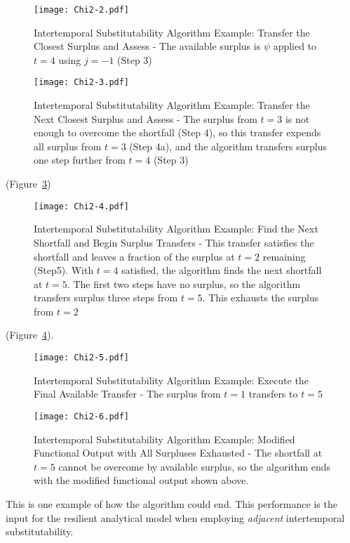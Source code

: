 \documentclass[preprint,12pt]{elsarticle}
\begin{document}
\begin{figure}[h]
  \centering\texttt{[image: Chi2-2.pdf]}
  \caption{Intertemporal Substitutability Algorithm Example: Transfer
    the Closest Surplus and Assess - The available surplus is $\psi$
    applied to $t=4$ using $j={-1}$ (Step 3)}
  \label{f:Chi2-2}
\end{figure}


\begin{figure}[h]
  \centering\texttt{[image: Chi2-3.pdf]}
  \caption{Intertemporal Substitutability Algorithm Example: Transfer
    the Next Closest Surplus and Assess - The surplus from $t=3$ is
    not enough to overcome the shortfall (Step 4), so this transfer
    expends all surplus from $t=3$ (Step 4a), and the algorithm
    transfers surplus one step further from $t=4$ (Step 3)}
  \label{f:Chi2-3}
\end{figure}


(Figure~\ref{f:Chi2-4})
\begin{figure}[h]
  \centering\texttt{[image: Chi2-4.pdf]}
  \caption{Intertemporal Substitutability Algorithm Example: Find the
    Next Shortfall and Begin Surplus Transfers - This transfer
    satisfies the shortfall and leaves a fraction of the surplus at
    $t=2$ remaining (Step5). With $t=4$ satisfied, the algorithm finds
    the next shortfall at $t=5$. The first two steps have no surplus,
    so the algorithm transfers surplus three steps from $t=5$. This
    exhausts the surplus from $t=2$}
  \label{f:Chi2-4}
\end{figure}
(Figure~\ref{f:Chi2-5}). 
\begin{figure}[h]
  \centering\texttt{[image: Chi2-5.pdf]}
  \caption{Intertemporal Substitutability Algorithm Example: Execute
    the Final Available Transfer - The surplus from $t=1$ transfers to
    $t=5$}
  \label{f:Chi2-5}
\end{figure}



\begin{figure}[h]
  \centering\texttt{[image: Chi2-6.pdf]}
  \caption{Intertemporal Substitutability Algorithm Example: Modified
    Functional Output with All Surpluses Exhausted - The shortfall at
    $t=5$ cannot be overcome by available surplus, so the algorithm
    ends with the modified functional output shown above.}
  \label{f:Chi2-6}
\end{figure}

This is one example of how the algorithm could
end. This performance is the input for the resilient
analytical model when employing \emph{adjacent} intertemporal
substitutability. 
\end{document}
